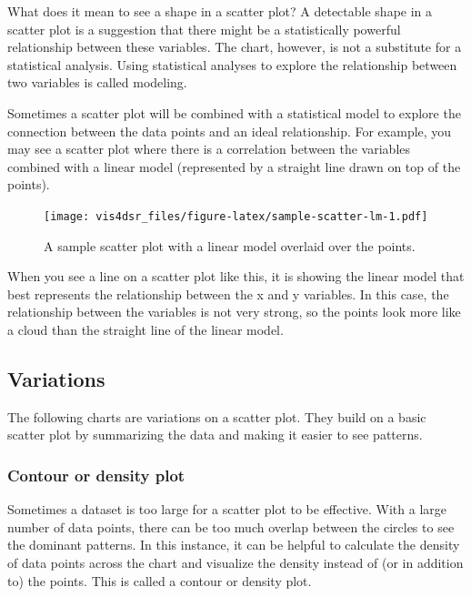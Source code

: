 \documentclass[
]{krantz}
\begin{document}
What does it mean to see a shape in a scatter plot? A detectable shape in a scatter
plot is a suggestion that there might be a statistically powerful relationship
between these variables. The chart, however, is not a substitute for a statistical
analysis. Using statistical analyses to explore the relationship between two variables
is called modeling.

Sometimes a scatter plot will be combined with a statistical model to explore
the connection between the data points and an ideal relationship. For example, you
may see a scatter plot where there is a correlation between the variables
combined with a linear model (represented by a straight line drawn on top of the points).

\begin{figure}
\centering
\texttt{[image: vis4dsr\_files/figure-latex/sample-scatter-lm-1.pdf]}
\caption{\label{fig:sample-scatter-lm}A sample scatter plot with a linear model overlaid over the points.}
\end{figure}

When you see a line on a scatter plot like this, it is showing the linear model
that best represents the relationship between the x and y variables. In this case,
the relationship between the variables is not very strong, so the points look more
like a cloud than the straight line of the linear model.

\hypertarget{variations-1}{%
\subsection{Variations}\label{variations-1}}

The following charts are variations on a scatter plot. They build on a basic
scatter plot by summarizing the data and making it easier to see patterns.

\hypertarget{contour-or-density-plot}{%
\subsubsection{Contour or density plot}\label{contour-or-density-plot}}

Sometimes a dataset is too large for a scatter plot to be effective. With a large
number of data points, there can be too much overlap between the circles to see
the dominant patterns. In this instance, it can be helpful to calculate the density
of data points across the chart and visualize the density instead of (or in addition to)
the points. This is called a contour or density plot.
\end{document}
